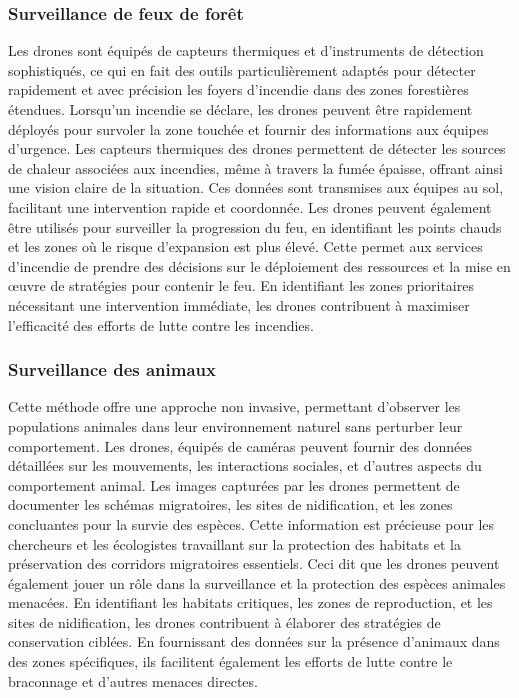 \subsubsection{Surveillance de feux de forêt}
Les drones sont équipés de capteurs thermiques et d'instruments de détection sophistiqués, ce qui en fait des outils particulièrement adaptés pour détecter rapidement et avec précision les foyers d'incendie dans des zones forestières étendues. Lorsqu'un incendie se déclare, les drones peuvent être rapidement déployés pour survoler la zone touchée et fournir des informations aux équipes d'urgence. Les capteurs thermiques des drones permettent de détecter les sources de chaleur associées aux incendies, même à travers la fumée épaisse, offrant ainsi une vision claire de la situation. Ces données sont transmises aux équipes au sol, facilitant une intervention rapide et coordonnée.
Les drones peuvent également être utilisés pour surveiller la progression du feu, en identifiant les points chauds et les zones où le risque d'expansion est plus élevé. Cette permet aux services d'incendie de prendre des décisions sur le déploiement des ressources et la mise en œuvre de stratégies pour contenir le feu. En identifiant les zones prioritaires nécessitant une intervention immédiate, les drones contribuent à maximiser l'efficacité des efforts de lutte contre les incendies. 

\subsubsection{Surveillance des animaux}
Cette méthode offre une approche non invasive, permettant d'observer les populations animales dans leur environnement naturel sans perturber leur comportement. Les drones, équipés de caméras peuvent fournir des données détaillées sur les mouvements, les interactions sociales, et d'autres aspects du comportement animal. Les images capturées par les drones permettent de documenter les schémas migratoires, les sites de nidification, et les zones concluantes pour la survie des espèces. Cette information est précieuse pour les chercheurs et les écologistes travaillant sur la protection des habitats et la préservation des corridors migratoires essentiels. Ceci dit que les drones peuvent également jouer un rôle dans la surveillance et la protection des espèces animales menacées. En identifiant les habitats critiques, les zones de reproduction, et les sites de nidification, les drones contribuent à élaborer des stratégies de conservation ciblées. En fournissant des données sur la présence d'animaux dans des zones spécifiques, ils facilitent également les efforts de lutte contre le braconnage et d'autres menaces directes.

